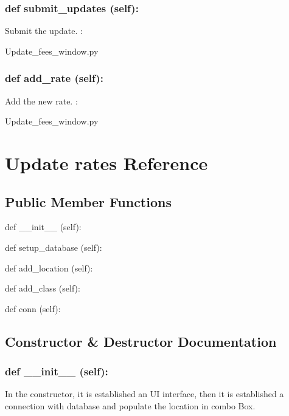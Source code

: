 \hypertarget{class_poly_a14a7ad77ce612b0c54f531d307ee4b39}{
\subsubsection[{def submit_updates (self):}]{\setlength{\rightskip}{0pt plus 5cm}def {submit\_updates} (self):}}\label{class_poly_a14a7ad77ce612b0c54f531d307ee4b39}
Submit the update.
:\begin{DoxyCompactItemize}
\item 
Update\_fees\_window.\-py\end{DoxyCompactItemize}

\hypertarget{class_poly_a14a7ad77ce612b0c54f531d307ee4b39}{
\subsubsection[{def add_rate (self):}]{\setlength{\rightskip}{0pt plus 5cm}def {add\_rate} (self):}}\label{class_poly_a14a7ad77ce612b0c54f531d307ee4b39}
Add the new rate.
:\begin{DoxyCompactItemize}
\item 
Update\_fees\_window.\-py\end{DoxyCompactItemize}

\hypertarget{Update_rates}{\section{Update rates Reference}
\label{Update_rates}
}
\subsection*{Public Member Functions}
\begin{DoxyCompactItemize}
\item 
def {\_\_init\_\_} (self):
\item 
def {setup\_database} (self):
\item 
def {add\_location} (self):
\item 
def {add\_class} (self):
\item 
def {conn} (self):
\end{DoxyCompactItemize}

\subsection{Constructor \& Destructor Documentation}
\hypertarget{class_poly_aa3def076b74bed67904976ad4f9fe9b1}{
\subsubsection[{def __init__ (self):}]{\setlength{\rightskip}{0pt plus 5cm}def {\_\_init\_\_} (self): 
}}
In the constructor, it is established an UI interface, then it is  established a connection with database and populate the location in combo Box.

